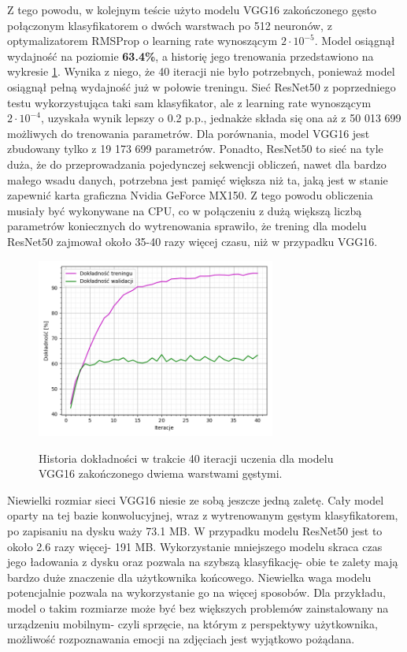 Z tego powodu, w kolejnym teście użyto modelu VGG16 zakończonego gęsto połączonym klasyfikatorem o dwóch warstwach po 512 neuronów, z optymalizatorem RMSProp o learning rate wynoszącym $2\cdot10^{-5}$. Model osiągnął wydajność na poziomie \textbf{63.4\%}, a historię jego trenowania przedstawiono na wykresie \ref{pic:5.7}. Wynika z niego, że 40 iteracji nie było potrzebnych, ponieważ model osiągnął pełną wydajność już w połowie treningu. Sieć ResNet50 z poprzedniego testu wykorzystująca taki sam klasyfikator, ale z learning rate wynoszącym $2\cdot10^{-4}$, uzyskała wynik lepszy o 0.2 p.p., jednakże składa się ona aż z 50 013 699 możliwych do trenowania parametrów. Dla porównania, model VGG16 jest zbudowany tylko z 19 173 699 parametrów. Ponadto, ResNet50 to sieć na tyle duża, że do przeprowadzania pojedynczej sekwencji obliczeń, nawet dla bardzo małego wsadu danych, potrzebna jest pamięć większa niż ta, jaką jest w stanie zapewnić karta graficzna Nvidia GeForce MX150. Z tego powodu obliczenia musiały być wykonywane na CPU, co w połączeniu z dużą większą liczbą parametrów koniecznych do wytrenowania sprawiło, że trening dla modelu ResNet50 zajmował około 35-40 razy więcej czasu, niż w przypadku VGG16.

\begin{figure}[H]
    \caption{Historia dokładności w trakcie 40 iteracji uczenia dla modelu VGG16 zakończonego dwiema warstwami gęstymi.}
    \centering
    \includegraphics[width=0.7\textwidth]{wykres7.png}
    \label{pic:5.7}
\end{figure}

Niewielki rozmiar sieci VGG16 niesie ze sobą jeszcze jedną zaletę. Cały model oparty na tej bazie konwolucyjnej, wraz z wytrenowanym gęstym klasyfikatorem, po zapisaniu na dysku waży 73.1 MB. W przypadku modelu ResNet50 jest to około 2.6 razy więcej- 191 MB. Wykorzystanie mniejszego modelu skraca czas jego ładowania z dysku oraz pozwala na szybszą klasyfikację- obie te zalety mają bardzo duże znaczenie dla użytkownika końcowego. Niewielka waga modelu potencjalnie pozwala na wykorzystanie go na więcej sposobów. Dla przykładu, model o takim rozmiarze może być bez większych problemów zainstalowany na urządzeniu mobilnym- czyli sprzęcie, na którym z perspektywy użytkownika, możliwość rozpoznawania emocji na zdjęciach jest wyjątkowo pożądana.

